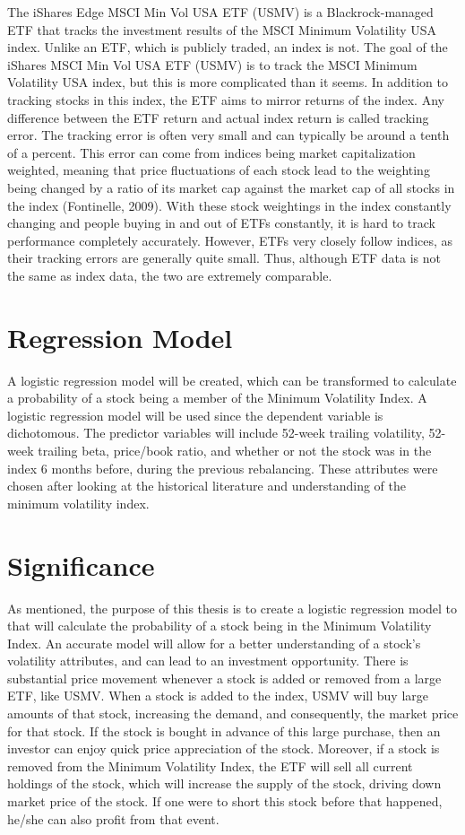 \documentclass[12pt,twoside]{reedthesis}
\theoremstyle{definition}
\theoremstyle{definition}
\theoremstyle{definition}
\theoremstyle{remark}
\begin{document}
The iShares Edge MSCI Min Vol USA ETF (USMV) is a Blackrock-managed ETF
that tracks the investment results of the MSCI Minimum Volatility USA
index. Unlike an ETF, which is publicly traded, an index is not. The
goal of the iShares MSCI Min Vol USA ETF (USMV) is to track the MSCI
Minimum Volatility USA index, but this is more complicated than it
seems. In addition to tracking stocks in this index, the ETF aims to
mirror returns of the index. Any difference between the ETF return and
actual index return is called tracking error. The tracking error is
often very small and can typically be around a tenth of a percent. This
error can come from indices being market capitalization weighted,
meaning that price fluctuations of each stock lead to the weighting
being changed by a ratio of its market cap against the market cap of all
stocks in the index (Fontinelle, 2009). With these stock weightings in
the index constantly changing and people buying in and out of ETFs
constantly, it is hard to track performance completely accurately.
However, ETFs very closely follow indices, as their tracking errors are
generally quite small. Thus, although ETF data is not the same as index
data, the two are extremely comparable.

\section{Regression Model}\label{regression-model}

A logistic regression model will be created, which can be transformed to
calculate a probability of a stock being a member of the Minimum
Volatility Index. A logistic regression model will be used since the
dependent variable is dichotomous. The predictor variables will include
52-week trailing volatility, 52-week trailing beta, price/book ratio,
and whether or not the stock was in the index 6 months before, during
the previous rebalancing. These attributes were chosen after looking at
the historical literature and understanding of the minimum volatility
index.

\section{Significance}\label{significance}

As mentioned, the purpose of this thesis is to create a logistic
regression model to that will calculate the probability of a stock being
in the Minimum Volatility Index. An accurate model will allow for a
better understanding of a stock's volatility attributes, and can lead to
an investment opportunity. There is substantial price movement whenever
a stock is added or removed from a large ETF, like USMV. When a stock is
added to the index, USMV will buy large amounts of that stock,
increasing the demand, and consequently, the market price for that
stock. If the stock is bought in advance of this large purchase, then an
investor can enjoy quick price appreciation of the stock. Moreover, if a
stock is removed from the Minimum Volatility Index, the ETF will sell
all current holdings of the stock, which will increase the supply of the
stock, driving down market price of the stock. If one were to short this
stock before that happened, he/she can also profit from that event.
\end{document}
